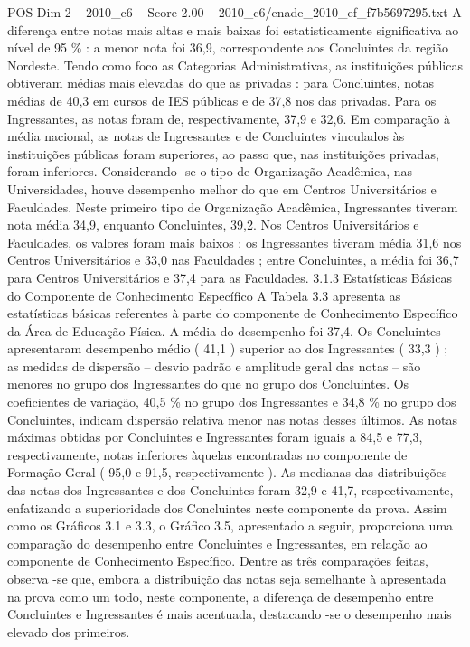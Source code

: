 \begin{textsample}{POS Dim 2 – 2010\_c6 – Score 2.00 – 2010\_c6/enade\_2010\_ef\_f7b5697295.txt}
A diferença entre notas mais altas e mais baixas foi estatisticamente significativa ao nível de 95 \% : a menor nota foi 36,9, correspondente aos Concluintes da região Nordeste.
Tendo como foco as Categorias Administrativas, as instituições públicas obtiveram médias mais elevadas do que as privadas : para Concluintes, notas médias de 40,3 em cursos de IES públicas e de 37,8 nos das privadas.
Para os Ingressantes, as notas foram de, respectivamente, 37,9 e 32,6.
Em comparação à média nacional, as notas de Ingressantes e de Concluintes vinculados às instituições públicas foram superiores, ao passo que, nas instituições privadas, foram inferiores.
Considerando -se o tipo de Organização Acadêmica, nas Universidades, houve desempenho melhor do que em Centros Universitários e Faculdades.
Neste primeiro tipo de Organização Acadêmica, Ingressantes tiveram nota média 34,9, enquanto Concluintes, 39,2.
Nos Centros Universitários e Faculdades, os valores foram mais baixos : os Ingressantes tiveram média 31,6 nos Centros Universitários e 33,0 nas Faculdades ; entre Concluintes, a média foi 36,7 para Centros Universitários e 37,4 para as Faculdades. 3.1.3 Estatísticas Básicas do Componente de Conhecimento Específico A Tabela 3.3 apresenta as estatísticas básicas referentes à parte do componente de Conhecimento Específico da Área de Educação Física.
A média do desempenho foi 37,4.
Os Concluintes apresentaram desempenho médio ( 41,1 ) superior ao dos Ingressantes ( 33,3 ) ; as medidas de dispersão – desvio padrão e amplitude geral das notas – são menores no grupo dos Ingressantes do que no grupo dos Concluintes.
Os coeficientes de variação, 40,5 \% no grupo dos Ingressantes e 34,8 \% no grupo dos Concluintes, indicam dispersão relativa menor nas notas desses últimos.
As notas máximas obtidas por Concluintes e Ingressantes foram iguais a 84,5 e 77,3, respectivamente, notas inferiores àquelas encontradas no componente de Formação Geral ( 95,0 e 91,5, respectivamente ).
As medianas das distribuições das notas dos Ingressantes e dos Concluintes foram 32,9 e 41,7, respectivamente, enfatizando a superioridade dos Concluintes neste componente da prova.
Assim como os Gráficos 3.1 e 3.3, o Gráfico 3.5, apresentado a seguir, proporciona uma comparação do desempenho entre Concluintes e Ingressantes, em relação ao componente de Conhecimento Específico.
Dentre as três comparações feitas, observa -se que, embora a distribuição das notas seja semelhante à apresentada na prova como um todo, neste componente, a diferença de desempenho entre Concluintes e Ingressantes é mais acentuada, destacando -se o desempenho mais elevado dos primeiros.

\end{textsample}
